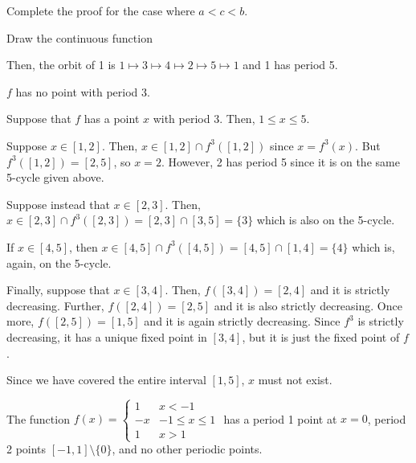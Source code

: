 \documentclass[class=pmath370,tikz,notes]{agony}
\begin{document}
\begin{xca}
  Complete the proof for the case where $a < c < b$.
\end{xca}


Draw the continuous function
\begin{center}
\end{center}
Then, the orbit of 1 is $1 \mapsto 3 \mapsto 4 \mapsto 2 \mapsto 5 \mapsto 1$
and 1 has period 5.

\begin{claim}
  $f$ has no point with period 3.
\end{claim}
\begin{prf}
  Suppose that $f$ has a point $x$ with period 3.
  Then, $1 \leq x \leq 5$.

  Suppose $x \in [1,2]$.
  Then, $x \in [1,2] \cap f^3([1,2])$ since $x = f^3(x)$.
  But $f^3([1,2]) = [2,5]$, so $x = 2$.
  However, 2 has period 5 since it is on the same 5-cycle given above.

  Suppose instead that $x \in [2,3]$.
  Then, $x \in [2,3] \cap f^3([2,3]) = [2,3] \cap [3,5] = \{3\}$
  which is also on the 5-cycle.

  If $x \in [4,5]$, then $x \in [4,5] \cap f^3([4,5]) = [4,5] \cap [1,4] = \{4\}$
  which is, again, on the 5-cycle.

  Finally, suppose that $x \in [3,4]$.
  Then, $f([3,4]) = [2,4]$ and it is strictly decreasing.
  Further, $f([2,4]) = [2,5]$ and it is also strictly decreasing.
  Once more, $f([2,5]) = [1,5]$ and it is again strictly decreasing.
  Since $f^3$ is strictly decreasing, it has a unique fixed point in $[3,4]$,
  but it is just the fixed point of $f$.

  Since we have covered the entire interval $[1,5]$, $x$ must not exist.
\end{prf}

\begin{example}
  The function $f(x) = \begin{cases}
      1 & x < -1 \\ -x & -1 \leq x \leq 1 \\ 1 & x > 1
    \end{cases}$
  has a period 1 point at $x=0$, period 2 points $[-1,1] \setminus \{0\}$,
  and no other periodic points.
\end{example}
\end{document}
